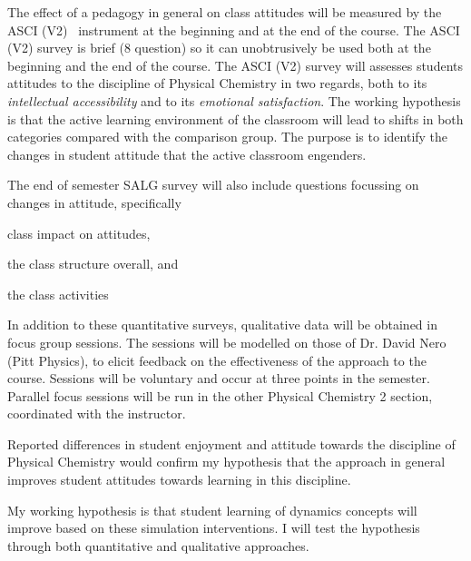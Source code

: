 \documentclass[10pt,letterpaper]{article}
\begin{document}
 The effect of a \pogil pedagogy in general on class attitudes will be measured by the ASCI (V2)~\cite{Xu2011} instrument at the beginning and at the end of the course. The ASCI (V2) survey is brief (8 question) so it can unobtrusively be used both at the beginning and the end of the course. The ASCI (V2) survey will assesses students attitudes to the discipline of Physical Chemistry in two regards, both to its \textit{intellectual accessibility} and to its \textit{emotional satisfaction}. The working hypothesis is that the active learning environment of the \pogil classroom will lead to shifts in both categories compared with the comparison group. The purpose is to identify the changes in student attitude that the active classroom engenders.

 The end of semester SALG survey will also include questions focussing on changes in attitude, specifically
\begin{enumerate*}[label=\textbf{\arabic*.)}]
  \item class impact on attitudes,
\item the class structure overall, and
\item the class activities
\end{enumerate*}

 In addition to these quantitative surveys, qualitative data will be obtained in focus group sessions. The sessions will be modelled on those of Dr. David Nero (Pitt Physics), to elicit feedback on the effectiveness of the \pogil approach to the course. Sessions will be voluntary and occur at three points in the semester. Parallel focus sessions will be run in the other Physical Chemistry 2 section, coordinated with the instructor. 

Reported differences in student enjoyment and attitude towards the discipline of Physical Chemistry would confirm my hypothesis that the \pogil approach in general improves student attitudes towards learning in this discipline. 


%
%
My working hypothesis is that student learning of dynamics concepts will improve based on these simulation interventions. I will test the hypothesis through both quantitative and qualitative approaches. 
\end{document}

